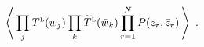 \begin{equation}
\label{Lcorrelators}
\left\langle \,\prod_j T^{\rm \scriptscriptstyle L}(w_j)
\prod_k \widetilde T^{\rm \scriptscriptstyle L}(\bar w_k)
\prod\limits_{r=1}^N P(z_r,\bar z_r)\,\right\rangle \ .
\end{equation}

